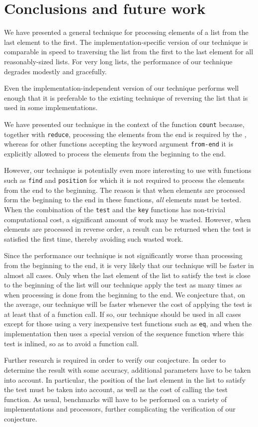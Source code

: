 \section{Conclusions and future work}

We have presented a general technique for processing elements of a
list from the last element to the first.  The implementation-specific
version of our technique is comparable in speed to traversing the list
from the first to the last element for all reasonably-sized lists.
For very long lists, the performance of our technique degrades
modestly and gracefully.

Even the implementation-independent version of our technique performs
well enough that it is preferable to the existing technique of
reversing the list that is used in some implementations.

We have presented our technique in the context of the function
\texttt{count} because, together with \texttt{reduce}, processing the
elements from the end is required by the \hs{}, whereas for other
functions accepting the keyword argument \texttt{from-end} it is
explicitly allowed to process the elements from the beginning to the
end.

However, our technique is potentially even more interesting to use
with functions such as \texttt{find} and \texttt{position} for which
it is not required to process the elements from the end to the
beginning.  The reason is that when elements are processed form the
beginning to the end in these functions, \emph{all} elements must be
tested.  When the combination of the \texttt{test} and the
\texttt{key} functions has non-trivial computational cost, a
significant amount of work may be wasted.  However, when elements are
processed in reverse order, a result can be returned when the test is
satisfied the first time, thereby avoiding such wasted work.

Since the performance our technique is not significantly worse than
processing from the beginning to the end, it is very likely that our
technique will be faster in almost all cases.  Only when the last
element of the list to satisfy the test is close to the beginning of
the list will our technique apply the test as many times as when
processing is done from the beginning to the end.  We conjecture that,
on the average, our technique will be faster whenever the cost of
applying the test is at least that of a function call.  If so, our
technique should be used in all cases except for those using a very
inexpensive test functions such as \texttt{eq}, and when the
implementation then uses a special version of the sequence function
where this test is inlined, so as to avoid a function call.

Further research is required in order to verify our conjecture.  In
order to determine the result with some accuracy, additional
parameters have to be taken into account.  In particular, the position
of the last element in the list to satisfy the test must be taken into
account, as well as the cost of calling the test function.  As usual,
benchmarks will have to be performed on a variety of implementations
and processors, further complicating the verification of our
conjecture.
